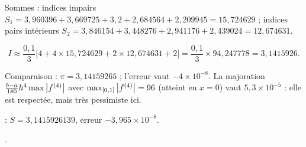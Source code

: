  Sommes : indices impairs
$S_1 = 3{,}960396 + 3{,}669725 + 3{,}2 + 2{,}684564 + 2{,}209945 = 15{,}724629$ ;
indices pairs intérieurs
$S_2 = 3{,}846154 + 3{,}448276 + 2{,}941176 + 2{,}439024 = 12{,}674631$.

\[
  I \approx \frac{0{,}1}{3}\bigl[4 + 4 \times 15{,}724629 + 2 \times 12{,}674631 + 2\bigr]
    = \frac{0{,}1}{3} \times 94{,}247778 = 3{,}1415926 .
\]

 Comparaison : $\pi = 3{,}14159265$ ; l'erreur vaut
$-4\times 10^{-8}$. La majoration $\frac{b-a}{180}h^4\max\left|f^{(4)}\right|$ avec
$\max_{[0,1]}\left|f^{(4)}\right| = 96$ (atteint en $x = 0$) vaut $5{,}3\times
10^{-5}$ : elle est respectée, mais très pessimiste ici.

\Verif {} : $S = 3{,}1415926139$, erreur
$-3{,}965\times 10^{-8}$.

\Refs {}.
